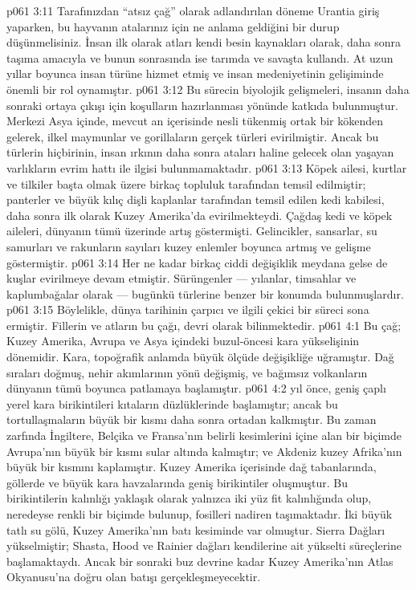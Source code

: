 \vs p061 3:11 Tarafınızdan “atsız çağ” olarak adlandırılan döneme Urantia giriş yaparken, bu hayvanın atalarınız için ne anlama geldiğini bir durup düşünmelisiniz. İnsan ilk olarak atları kendi besin kaynakları olarak, daha sonra taşıma amacıyla ve bunun sonrasında ise tarımda ve savaşta kullandı. At uzun yıllar boyunca insan türüne hizmet etmiş ve insan medeniyetinin gelişiminde önemli bir rol oynamıştır.
\vs p061 3:12 Bu sürecin biyolojik gelişmeleri, insanın daha sonraki ortaya çıkışı için koşulların hazırlanması yönünde katkıda bulunmuştur. Merkezi Asya içinde, mevcut an içerisinde nesli tükenmiş ortak bir kökenden gelerek, ilkel maymunlar ve gorillaların gerçek türleri evirilmiştir. Ancak bu türlerin hiçbirinin, insan ırkının daha sonra ataları haline gelecek olan yaşayan varlıkların evrim hattı ile ilgisi bulunmamaktadır.
\vs p061 3:13 Köpek ailesi, kurtlar ve tilkiler başta olmak üzere birkaç topluluk tarafından temsil edilmiştir; panterler ve büyük kılıç dişli kaplanlar tarafından temsil edilen kedi kabilesi, daha sonra ilk olarak Kuzey Amerika’da evirilmekteydi. Çağdaş kedi ve köpek aileleri, dünyanın tümü üzerinde artış göstermişti. Gelincikler, sansarlar, su samurları ve rakunların sayıları kuzey enlemler boyunca artmış ve gelişme göstermiştir.
\vs p061 3:14 Her ne kadar birkaç ciddi değişiklik meydana gelse de kuşlar evirilmeye devam etmiştir. Sürüngenler --- yılanlar, timsahlar ve kaplumbağalar olarak --- bugünkü türlerine benzer bir konumda bulunmuşlardır.
\vs p061 3:15 Böylelikle, dünya tarihinin çarpıcı ve ilgili çekici bir süreci sona ermiştir. Fillerin ve atların bu çağı,  devri olarak bilinmektedir.
\vs p061 4:1 Bu çağ; Kuzey Amerika, Avrupa ve Asya içindeki buzul\hyp{}öncesi kara yükselişinin dönemidir. Kara, topoğrafik anlamda büyük ölçüde değişikliğe uğramıştır. Dağ sıraları doğmuş, nehir akımlarının yönü değişmiş, ve bağımsız volkanların dünyanın tümü boyunca patlamaya başlamıştır.
\vs p061 4:2  yıl önce, geniş çaplı yerel kara birikintileri kıtaların düzlüklerinde başlamıştır; ancak bu tortullaşmaların büyük bir kısmı daha sonra ortadan kalkmıştır. Bu zaman zarfında İngiltere, Belçika ve Fransa’nın belirli kesimlerini içine alan bir biçimde Avrupa’nın büyük bir kısmı sular altında kalmıştır; ve Akdeniz kuzey Afrika’nın büyük bir kısmını kaplamıştır. Kuzey Amerika içerisinde dağ tabanlarında, göllerde ve büyük kara havzalarında geniş birikintiler oluşmuştur. Bu birikintilerin kalınlığı yaklaşık olarak yalnızca iki yüz fit kalınlığında olup, neredeyse renkli bir biçimde bulunup, fosilleri nadiren taşımaktadır. İki büyük tatlı su gölü, Kuzey Amerika’nın batı kesiminde var olmuştur. Sierra Dağları yükselmiştir; Shasta, Hood ve Rainier dağları kendilerine ait yükselti süreçlerine başlamaktaydı. Ancak bir sonraki buz devrine kadar Kuzey Amerika’nın Atlas Okyanusu’na doğru olan batışı gerçekleşmeyecektir.
